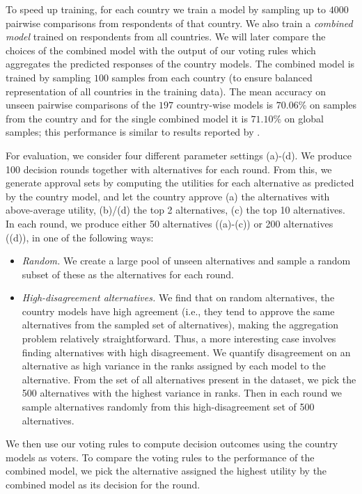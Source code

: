 \documentclass[10pt]{scrartcl}
\theoremstyle{plain}
\theoremstyle{definition}
\begin{document}
To speed up training, for each country we train a model by sampling up to $4000$ pairwise comparisons from respondents of that country. We also train a \emph{combined model} trained on respondents from all countries. We will later compare the choices of the combined model with the output of our voting rules which aggregates the predicted responses of the country models. The combined model is trained by sampling $100$ samples from each country (to ensure balanced representation of all countries in the training data). The mean accuracy on unseen pairwise comparisons of the $197$ country-wise models is $70.06\%$ on samples from the country and for the single combined model it is $71.10\%$ on global samples; this performance is similar to results reported by \citet{kim2018computational}. 

For evaluation, we consider four different parameter settings (a)-(d). We produce 100 decision rounds together with alternatives for each round. From this, we generate approval sets by computing the utilities for each alternative as predicted by the country model, and let the country approve (a) the alternatives with above-average utility, (b)/(d) the top 2 alternatives, (c) the top 10 alternatives. In each round, we produce either 50 alternatives ((a)-(c)) or 200 alternatives ((d)), in one of the following ways:
\begin{itemize}[leftmargin=15pt]
	\item \emph{Random.} We create a large pool of unseen alternatives and sample a random subset of these as the alternatives for each round. 
	\item \emph{High-disagreement alternatives.} We find that on random alternatives, the country models have high agreement (i.e., they tend to approve the same alternatives from the sampled set of alternatives), making the aggregation problem relatively straightforward. Thus, a more interesting case involves finding alternatives with high disagreement. We quantify disagreement on an alternative as high variance in the ranks assigned by each model to the alternative. From the set of all alternatives present in the dataset, we pick the 500 alternatives with the highest variance in ranks. Then in each round we sample alternatives randomly from this high-disagreement set of 500 alternatives.
\end{itemize}

We then use our voting rules to compute decision outcomes using the country models as voters. 
To compare the voting rules to the performance of the combined model, we pick the alternative assigned the highest utility by the combined model as its decision for the round.
\end{document}
